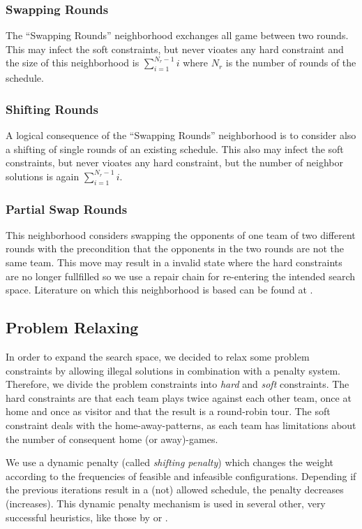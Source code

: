 \documentclass[a4paper,11pt]{article}
\begin{document}
\subsubsection{Swapping Rounds}
The ``Swapping Rounds'' neighborhood exchanges all game between two rounds. This may infect the soft constraints, but never vioates any hard constraint and the 
size of this neighborhood is $\sum_{i=1}^{N_r-1}i$ where $N_r$ is the number of rounds of the schedule.

\subsubsection{Shifting Rounds}
A logical consequence of the ``Swapping Rounds'' neighborhood is to consider also a shifting of single rounds of an existing schedule. 
This also may infect the soft constraints, but never vioates any hard constraint, but the number of neighbor solutions is again $\sum_{i=1}^{N_r-1}i$.

\subsubsection{Partial Swap Rounds}
This neighborhood considers swapping the opponents of one team of two different rounds with the precondition that the opponents in the 
two rounds are not the same team. This move may result in a invalid state where the hard constraints are no longer fullfilled so we use a 
repair chain for re-entering the intended search space. Literature on which this neighborhood is based can be found at \cite{Gaspero07,HentenryckV06, Chen_anant}.

\subsection{Problem Relaxing}
In order to expand the search space, we decided to relax some problem constraints by allowing illegal solutions in combination with a penalty system.
Therefore, we divide the problem constraints into \emph{hard} and \emph{soft} constraints. The hard constraints are that each team plays twice against 
each other team, once at home and once as visitor and that the result is a round-robin tour. 
The soft constraint deals with the home-away-patterns, as each team has limitations about the number of consequent home (or away)-games.

We use a dynamic penalty (called \emph{shifting penalty}) which changes the weight according to the frequencies of feasible and infeasible configurations.
 Depending if the previous iterations result in a (not) allowed schedule, the penalty decreases (increases). 
This dynamic penalty mechanism is used in several other, very successful heuristics, like those by \cite{Anagnostopoulos06} or \cite{Gaspero07}.
\end{document}
